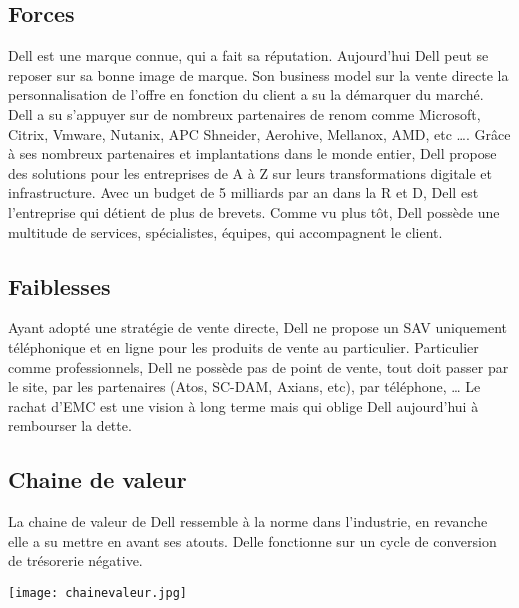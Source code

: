\documentclass{bredele} %
\begin{document}
                \subsection*{Forces}
                Dell est une marque connue, qui a fait sa réputation. Aujourd’hui Dell peut se reposer sur sa bonne image de marque. Son business model sur la vente directe la personnalisation de l’offre en fonction du client a su la démarquer du marché.
    \newline
    Dell a su s’appuyer sur de nombreux partenaires de renom comme Microsoft, Citrix, Vmware, Nutanix, APC Shneider, Aerohive, Mellanox, AMD, etc ….
    \newline
    Grâce à ses nombreux partenaires et implantations dans le monde entier, Dell propose des solutions pour les entreprises de A à Z sur leurs transformations digitale et infrastructure.
    \newline
    Avec un budget de 5 milliards par an dans la R et D, Dell est l’entreprise qui détient de plus de brevets.
    \newline
    Comme vu plus tôt, Dell possède une multitude de services, spécialistes, équipes, qui accompagnent le client.
                \subsection*{Faiblesses}
                Ayant adopté une stratégie de vente directe, Dell ne propose un SAV uniquement téléphonique et en ligne pour les produits de vente au particulier.
    \newline
    Particulier comme professionnels, Dell ne possède pas de point de vente, tout doit passer par le site, par les partenaires (Atos, SC-DAM, Axians, etc), par téléphone, …
    \newline
    Le rachat d’EMC est une vision à long terme mais qui oblige Dell aujourd’hui à rembourser la dette.
                \subsection*{Chaine de valeur}
                La chaine de valeur de Dell ressemble à la norme dans l’industrie, en revanche elle a su mettre en avant ses atouts. Delle fonctionne sur un cycle de conversion de trésorerie négative.
                \begin{center}
                    \texttt{[image: chainevaleur.jpg]}
                \end{center}
\end{document}
